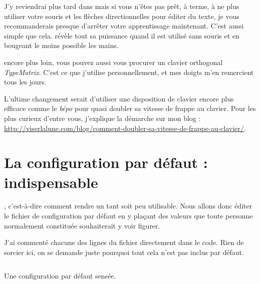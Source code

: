 J'y reviendrai plus tard dans \og {} \fg{} mais si vous n'êtes pas prêt, à terme, à ne plus utiliser votre souris et les flèches directionnelles pour éditer du texte, je vous recommanderais presque d'arrêter votre apprentissage maintenant. C'est aussi simple que cela. \vim révèle tout sa puissance quand il est utilisé sans souris et en bougeant le moins possible les mains.

 encore plus loin, vous pouvez aussi vous procurer un clavier orthogonal \emph{TypeMatrix}. C'est ce que j'utilise personnellement, et mes doigts m'en remercient tous les jours.

L'ultime changement serait d'utiliser une disposition de clavier encore plus efficace comme le \emph{bépo} pour quasi doubler sa vitesse de frappe au clavier. Pour les plus curieux d'entre vous, j'explique la démarche sur mon blog : \url{http://viserlalune.com/blog/comment-doubler-sa-vitesse-de-frappe-au-clavier/}.


\newpage
\section{La configuration par défaut : indispensable}

, c'est-à-dire comment rendre \vim un tant soit peu utilisable. Nous allons donc éditer le fichier de configuration par défaut \vimrc{} en y plaçant des valeurs que toute personne normalement constituée souhaiterait y voir figurer.

J'ai commenté chacune des lignes du fichier directement dans le code. Rien de sorcier ici, on se demande juste pourquoi tout cela n'est pas inclus par défaut.

\begin{listing}[H]
    \inputminted[bgcolor=bg, fontsize=\footnotesize]{vim}{../../vim-for-humans/firstconfig/vimrc}
    \caption{Une configuration par défaut sensée.}
    \label{code:first-config}
\end{listing}

